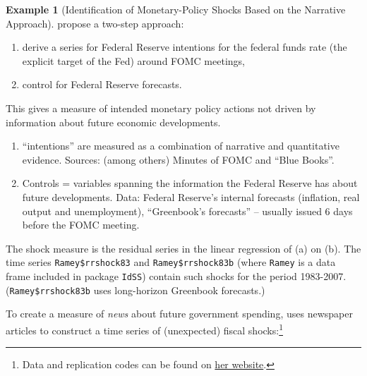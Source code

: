 \documentclass[
  12pt,
]{book}
\providecommand{\tightlist}{%
  \setlength{\itemsep}{0pt}\setlength{\parskip}{0pt}}
\theoremstyle{definition}
\theoremstyle{definition}
\newtheorem{example}{Example}[chapter]
\theoremstyle{definition}
\theoremstyle{definition}
\theoremstyle{remark}
\begin{document}
\begin{example}[Identification of Monetary-Policy Shocks Based on the Narrative Approach]
\protect\hypertarget{exm:RomerRomer}{}\label{exm:RomerRomer}\citet{Romer_Romer_2004} propose a two-step approach:

\begin{enumerate}
\def\labelenumi{\alph{enumi}.}
\tightlist
\item
  derive a series for Federal Reserve intentions for the federal funds rate (the explicit target of the Fed) around FOMC meetings,
\item
  control for Federal Reserve forecasts.
\end{enumerate}

This gives a measure of intended monetary policy actions not driven by information about future economic developments.

\begin{enumerate}
\def\labelenumi{\alph{enumi}.}
\tightlist
\item
  ``intentions'' are measured as a combination of narrative and quantitative evidence. Sources: (among others) Minutes of FOMC and ``Blue Books''.
\item
  Controls = variables spanning the information the Federal Reserve has about future developments. Data: Federal Reserve's internal forecasts (inflation, real output and unemployment), ``Greenbook's forecasts'' -- usually issued 6 days before the FOMC meeting.
\end{enumerate}

The shock measure is the residual series in the linear regression of (a) on (b). The time series \texttt{Ramey\$rrshock83} and \texttt{Ramey\$rrshock83b} (where \texttt{Ramey} is a data frame included in package \texttt{IdSS}) contain such shocks for the period 1983-2007. (\texttt{Ramey\$rrshock83b} uses long-horizon Greenbook forecasts.)
\end{example}

To create a measure of \emph{news} about future government spending, \citet{Ramey_2011} uses newspaper articles to construct a time series of (unexpected) fiscal shocks:\footnote{Data and replication codes can be found on \href{https://econweb.ucsd.edu/~vramey/research.html\#govt}{her website}.}
\end{document}
